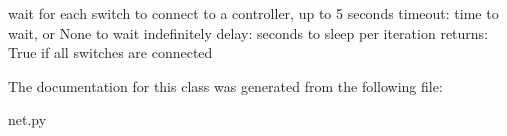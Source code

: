 \begin{DoxyVerb}wait for each switch to connect to a controller,
   up to 5 seconds
   timeout: time to wait, or None to wait indefinitely
   delay: seconds to sleep per iteration
   returns: True if all switches are connected\end{DoxyVerb}
 

The documentation for this class was generated from the following file\-:\begin{DoxyCompactItemize}
\item 
net.\-py\end{DoxyCompactItemize}
